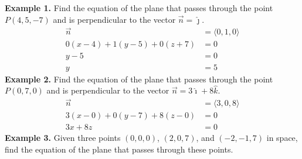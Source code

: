 \newpage
\noindent\textbf{Example 1. } Find the
equation of the plane that passes through the point $P(4, 5, -7)$ and is
perpendicular to the vector $\vec{n} = \hat{\jmath}$.
\begin{align*}
    \vec{n}                        & = \langle 0, 1, 0 \rangle \\
    0(x - 4) + 1(y - 5) + 0(z + 7) & = 0                       \\
    y - 5                          & = 0                       \\
    y                              & = 5
\end{align*}
\noindent\textbf{Example 2. } Find the
equation of the plane that passes through the point $P(0, 7, 0)$ and is
perpendicular to the vector $\vec{n} = 3\hat{\imath} + 8\hat{k}$.
\begin{align*}
    \vec{n}                        & = \langle 3, 0, 8 \rangle \\
    3(x - 0) + 0(y - 7) + 8(z - 0) & = 0                       \\
    3x + 8z                        & = 0
\end{align*}
\noindent\textbf{Example 3. } Given three points $(0, 0, 0)$, $(2, 0, 7)$, and $(-2, -1, 7)$ in space, find the equation of the plane that passes through these points.
